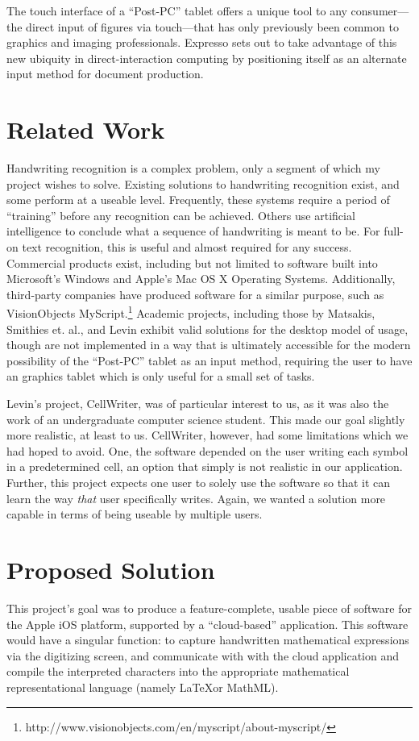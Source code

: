 \documentclass{acm_proc_article-sp}
\begin{document}
The touch interface of a ``Post-PC'' tablet offers a unique tool to any consumer---the direct input of figures via touch---that has only previously been common to graphics and imaging professionals. Expresso sets out to take advantage of this new ubiquity in direct-interaction computing by positioning itself as an alternate input method for document production.

\section{Related Work}

Handwriting recognition is a complex problem, only a segment of which my project wishes to solve. Existing solutions to handwriting recognition exist, and some  perform at a useable level. Frequently, these systems require a period of ``training'' before any recognition can be achieved. Others use artificial intelligence to conclude what a sequence of handwriting is meant to be. For full-on text recognition, this is useful and almost required for any success. Commercial products exist, including but not limited to software built into Microsoft's Windows and Apple's Mac OS X Operating Systems. Additionally, third-party companies have produced software for a similar purpose, such as VisionObjects MyScript.\footnote{http://www.visionobjects.com/en/myscript/about-myscript/} Academic projects, including those by Matsakis\cite{matsakis_recognition_1999}, Smithies et. al.\cite{smithies_handwriting-based_1999}, and Levin\cite{levin_cellwriter:_2007} exhibit valid solutions for the desktop model of usage, though are not implemented in a way that is ultimately accessible for the modern possibility of the ``Post-PC'' tablet as an input method, requiring the user to have an graphics tablet which is only useful for a small set of tasks. 

Levin's project, CellWriter, was of particular interest to us, as it was also the work of an undergraduate computer science student. This made our goal slightly more realistic, at least to us. CellWriter, however, had some limitations which we had hoped to avoid. One, the software depended on the user writing each symbol in a predetermined cell, an option that simply is not realistic in our application. Further, this project expects one user to solely use the software so that it can learn the way \emph{that} user specifically writes. Again, we wanted a solution more capable in terms of being useable by multiple users.

\section{Proposed Solution}
This project's goal was to produce a feature-complete, usable piece of software for the Apple iOS platform, supported by a ``cloud-based'' application. This software would have a singular function: to capture handwritten mathematical expressions via the digitizing screen, and communicate with with the cloud application and compile the interpreted characters into the appropriate mathematical representational language (namely \LaTeX or MathML). 
\end{document}
